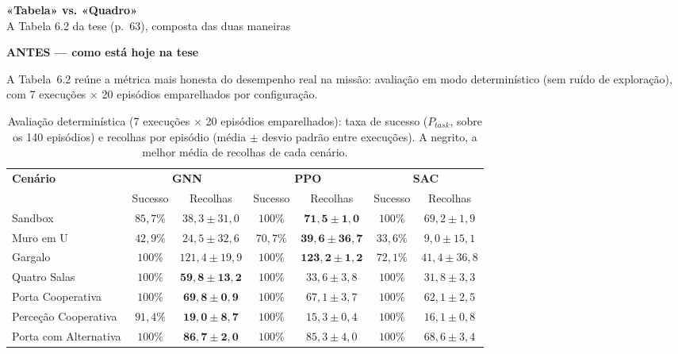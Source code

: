 \documentclass[12pt,reqno,twoside]{amsbook}
\numberwithin{table}{chapter}
\newcommand{\rotulo}[2]{%
  \par\medskip\noindent
  \colorbox{#1}{\parbox{\dimexpr\textwidth-2\fboxsep}{\bfseries\sffamily #2}}%
  \par\medskip}
\begin{document}
\setcounter{chapter}{6}

\begin{center}
{\Large\bfseries\sffamily «Tabela» vs. «Quadro»}\\[2pt]
{\sffamily A Tabela 6.2 da tese (p.\ 63), composta das duas maneiras}
\end{center}

\rotulo{black!10}{ANTES — como está hoje na tese}

\setcounter{table}{1}
\renewcommand{\tablename}{Tabela}

A Tabela~6.2 reúne a métrica mais honesta do desempenho real na missão:
avaliação em modo determinístico (sem ruído de exploração), com 7 execuções
$\times$ 20 episódios emparelhados por configuração.

\begin{table}[H]
\centering
\footnotesize
\caption{Avaliação determinística (7 execuções $\times$ 20 episódios emparelhados): taxa de sucesso ($P_{task}$, sobre os 140 episódios) e recolhas por episódio (média $\pm$ desvio padrão entre execuções). A negrito, a melhor média de recolhas de cada cenário.}
\renewcommand{\arraystretch}{1.3}
\begin{tabular}{|l|c|c|c|c|c|c|}
\hline
\textbf{Cenário} & \multicolumn{2}{c|}{\textbf{GNN}} & \multicolumn{2}{c|}{\textbf{PPO}} & \multicolumn{2}{c|}{\textbf{SAC}} \\ \cline{2-7}
 & Sucesso & Recolhas & Sucesso & Recolhas & Sucesso & Recolhas \\ \hline
Sandbox & $85{,}7\%$ & $38{,}3 \pm 31{,}0$ & $100\%$ & $\mathbf{71{,}5 \pm 1{,}0}$ & $100\%$ & $69{,}2 \pm 1{,}9$ \\ \hline
Muro em U & $42{,}9\%$ & $24{,}5 \pm 32{,}6$ & $70{,}7\%$ & $\mathbf{39{,}6 \pm 36{,}7}$ & $33{,}6\%$ & $9{,}0 \pm 15{,}1$ \\ \hline
Gargalo & $100\%$ & $121{,}4 \pm 19{,}9$ & $100\%$ & $\mathbf{123{,}2 \pm 1{,}2}$ & $72{,}1\%$ & $41{,}4 \pm 36{,}8$ \\ \hline
Quatro Salas & $100\%$ & $\mathbf{59{,}8 \pm 13{,}2}$ & $100\%$ & $33{,}6 \pm 3{,}8$ & $100\%$ & $31{,}8 \pm 3{,}3$ \\ \hline
Porta Cooperativa & $100\%$ & $\mathbf{69{,}8 \pm 0{,}9}$ & $100\%$ & $67{,}1 \pm 3{,}7$ & $100\%$ & $62{,}1 \pm 2{,}5$ \\ \hline
Perceção Cooperativa & $91{,}4\%$ & $\mathbf{19{,}0 \pm 8{,}7}$ & $100\%$ & $15{,}3 \pm 0{,}4$ & $100\%$ & $16{,}1 \pm 0{,}8$ \\ \hline
Porta com Alternativa & $100\%$ & $\mathbf{86{,}7 \pm 2{,}0}$ & $100\%$ & $85{,}3 \pm 4{,}0$ & $100\%$ & $68{,}6 \pm 3{,}4$ \\ \hline
\end{tabular}
\end{table}
\end{document}
